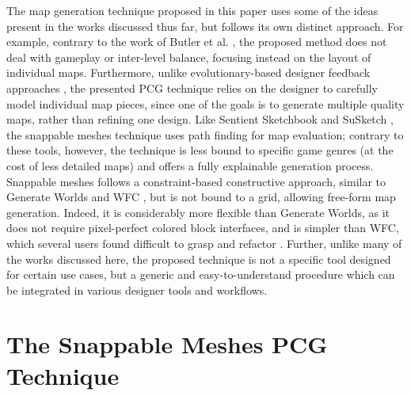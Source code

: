 \documentclass[journal]{IEEEtran}
\begin{document}
The map generation technique proposed in this paper uses some of the ideas present in the
works discussed thus far, but follows its own distinct approach. For example, contrary to
the work of Butler et al. \cite{butler2013mixed}, the proposed method does not deal with
gameplay or inter-level balance, focusing instead on the layout of individual maps.
Furthermore, unlike evolutionary-based designer feedback approaches
\cite{baldwin2017mixed,walton2020mixed,liapis2013sentient,migkotzidis2021susketch},
the presented PCG technique relies on the designer to carefully model individual map pieces,
since one of the goals is to generate multiple quality maps, rather than refining one design.
Like Sentient Sketchbook \cite{liapis2013sentient} and SuSketch \cite{migkotzidis2021susketch},
the snappable meshes technique uses path finding for map evaluation; contrary to these tools,
however, the technique is less bound to specific game genres (at the cost of less detailed maps)
and offers a fully explainable generation process. Snappable meshes follows a constraint-based
constructive approach, similar to Generate Worlds \cite{dykeman2019introducing} and WFC
\cite{gumin2016wfc}, but is not bound to a grid, allowing free-form map generation. Indeed,
it is considerably more flexible than Generate Worlds, as it does not require pixel-perfect
colored block interfaces, and is simpler than WFC, which several users found difficult to
grasp and refactor \cite{karth2021wavefunctioncollapse}. Further, unlike many of the works
discussed here, the proposed technique is not a specific tool designed for certain use cases,
but a generic and easy-to-understand procedure which can be integrated in various designer
tools and workflows.

\section{The Snappable Meshes PCG Technique}
\label{sec:methods}
\end{document}
